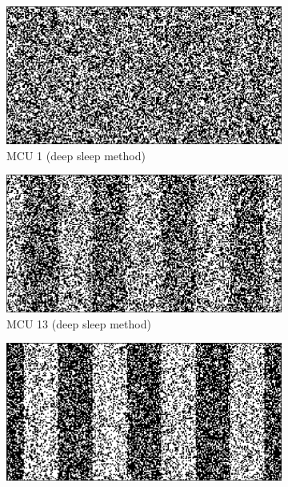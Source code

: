 \begin{figure}[ht!]
        \centering
        \captionsetup{justification=centering,margin=0.5cm}
        \begin{subfigure}[b]{0.475\textwidth}
            \centering
            \includegraphics[width=\textwidth]{images/1_response_sleep.png}
            \caption{MCU 1 (deep sleep method)}    
            \label{fig:mcu_1}
        \end{subfigure}
        \hfill
        \begin{subfigure}[b]{0.475\textwidth}  
            \centering 
            \includegraphics[width=\textwidth]{images/13_response_sleep.png}
            \caption{MCU 13 (deep sleep method)}    
            \label{fig:mcu_13}
        \end{subfigure}
        \vskip 1.75mm
        \begin{subfigure}[b]{0.475\textwidth}   
            \centering 
            \includegraphics[width=\textwidth]{images/11_response_rtc.png}

\end{subfigure}
\end{figure}

